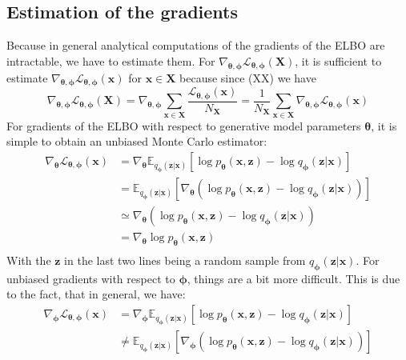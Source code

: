 \documentclass[12pt]{report}
\theoremstyle{definition}
\begin{document}
\subsection{Estimation of the gradients}
Because in general analytical computations of the gradients of the ELBO are intractable, we have to estimate them. For $\nabla_{\pmb{\theta}, \pmb{\phi}}\mathcal{L}_{\pmb{\theta}, \pmb{\phi}}(\mathbf{X})$, it is sufficient to estimate $\nabla_{\pmb{\theta}, \pmb{\phi}}\mathcal{L}_{\pmb{\theta}, \pmb{\phi}}(\mathbf{x})$ for $\mathbf{x} \in \mathbf{X}$ because since (XX) we have
\begin{equation}
	\nabla_{\pmb{\theta}, \pmb{\phi}}\mathcal{L}_{\pmb{\theta}, \pmb{\phi}}(\mathbf{X}) = \nabla_{\pmb{\theta}, \pmb{\phi}}  \sum_{\mathbf{x} \in \mathbf{X}} \frac{\mathcal{L}_{\mathbf{\theta}, \mathbf{\phi}}(\mathbf{x})}{N_{\mathbf{X}}} = \frac{1}{N_{\mathbf{X}}} \sum_{\mathbf{x} \in \mathbf{X}} \nabla_{\pmb{\theta}, \pmb{\phi}} \mathcal{L}_{\mathbf{\theta}, \mathbf{\phi}}(\mathbf{x})
\end{equation}
For gradients of the ELBO with respect to generative model parameters $\pmb{\theta}$, it is simple to obtain an unbiased Monte Carlo estimator:
\begin{equation}
\begin{split}
\nabla_{\pmb{\theta}}\mathcal{L}_{\pmb{\theta}, \pmb{\phi}}(\mathbf{x}) 
& = \nabla_{\pmb{\theta}} \mathbb{E}_{q_{\mathbf{\phi}}(\mathbf{z}|\mathbf{x})}\left[ \log p_{\mathbf{\theta}}(\mathbf{x}, \mathbf{z}) - \log q_{\mathbf{\phi}}(\mathbf{z}|\mathbf{x}) \right]	\\
& = \mathbb{E}_{q_{\mathbf{\phi}}(\mathbf{z}|\mathbf{x})}\left[ \nabla_{\pmb{\theta}} (\log p_{\mathbf{\theta}}(\mathbf{x}, \mathbf{z}) - \log q_{\mathbf{\phi}}(\mathbf{z}|\mathbf{x})) \right] \\
& \simeq \nabla_{\pmb{\theta}} (\log p_{\mathbf{\theta}}(\mathbf{x}, \mathbf{z}) - \log q_{\mathbf{\phi}}(\mathbf{z}|\mathbf{x})) \\
& = \nabla_{\pmb{\theta}} \log p_{\mathbf{\theta}}(\mathbf{x}, \mathbf{z})\\
\end{split}
\end{equation}
With the $\mathbf{z}$ in the last two lines being a random sample from $q_{\mathbf{\phi}}(\mathbf{z}|\mathbf{x})$. For unbiased gradients with respect to $\pmb{\phi}$, things are a bit more difficult. This is due to the fact, that in general, we have:
\begin{equation}
\begin{split}
\nabla_{\pmb{\phi}}\mathcal{L}_{\pmb{\theta}, \pmb{\phi}}(\mathbf{x}) 
& = \nabla_{\pmb{\phi}} \mathbb{E}_{q_{\mathbf{\phi}}(\mathbf{z}|\mathbf{x})}\left[ \log p_{\mathbf{\theta}}(\mathbf{x}, \mathbf{z}) - \log q_{\mathbf{\phi}}(\mathbf{z}|\mathbf{x}) \right]	\\
& \neq \mathbb{E}_{q_{\mathbf{\phi}}(\mathbf{z}|\mathbf{x})}\left[ \nabla_{\pmb{\phi}} (\log p_{\mathbf{\theta}}(\mathbf{x}, \mathbf{z}) - \log q_{\pmb{\phi}}(\mathbf{z}|\mathbf{x})) \right] \\
\end{split}
\end{equation}
\end{document}
